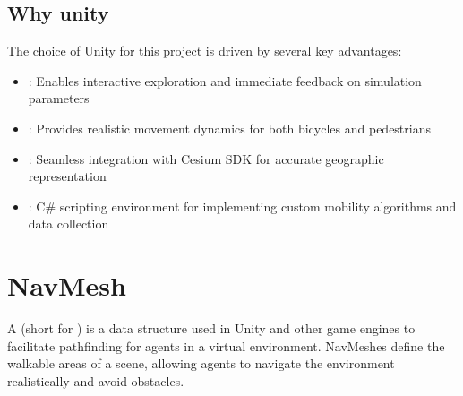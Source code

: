 \documentclass[letterpaper,10pt,english]{jupyterBook}
\begin{document}
\section{Why unity}
\label{\detokenize{Unity:why-unity}}
\sphinxAtStartPar
The choice of Unity for this project is driven by several key advantages:
\begin{itemize}
\item {} 
\sphinxAtStartPar
{}: Enables interactive exploration and immediate feedback on simulation parameters

\item {} 
\sphinxAtStartPar
{}: Provides realistic movement dynamics for both bicycles and pedestrians

\item {} 
\sphinxAtStartPar
{}: Seamless integration with Cesium SDK for accurate geographic representation

\item {} 
\sphinxAtStartPar
{}: C\# scripting environment for implementing custom mobility algorithms and data collection

\end{itemize}

\sphinxstepscope


\chapter{NavMesh}
\label{\detokenize{Navmesh:navmesh}}\label{\detokenize{Navmesh::doc}}
\sphinxAtStartPar
A  (short for ) is a data structure used in Unity and other game engines to facilitate pathfinding for agents in a virtual environment. NavMeshes define the walkable areas of a scene, allowing agents to navigate the environment realistically and avoid obstacles.
\end{document}
